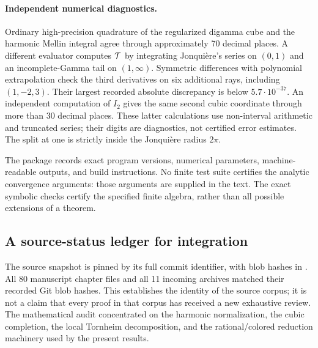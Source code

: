 \paragraph{Independent numerical diagnostics.}
Ordinary high-precision quadrature of the regularized digamma cube
and the harmonic Mellin integral agree through approximately 70
decimal places. A different evaluator computes $\mathcal T$ by integrating
Jonqui\`ere's series on $(0,1)$ and an incomplete-Gamma tail on
$(1,\infty)$. Symmetric differences with polynomial extrapolation
check the third derivatives on six additional rays, including
$(1,-2,3)$. Their largest recorded absolute discrepancy is below
$5.7\cdot10^{-37}$. An independent computation of $I_2$ gives the
same second cubic coordinate through more than 30 decimal places.
These latter calculations use non-interval arithmetic and truncated
series; their digits are diagnostics, not certified error estimates.
The split at one is strictly inside the Jonqui\`ere radius $2\pi$.

The package records exact program versions, numerical parameters,
machine-readable outputs, and build instructions. No finite test
suite certifies the analytic convergence arguments: those arguments
are supplied in the text. The exact symbolic checks certify the
specified finite algebra, rather than all possible extensions of a
theorem.

\subsection{A source-status ledger for integration}

The source snapshot is pinned by its full commit identifier, with
blob hashes in .
All 80 manuscript chapter files and all 11 incoming archives matched
their recorded Git blob hashes. This establishes the identity of the
source corpus; it is not a claim that every proof in that corpus has
received a new exhaustive review. The mathematical audit concentrated
on the harmonic normalization, the cubic completion, the local
Tornheim decomposition, and the rational/colored reduction machinery
used by the present results.


